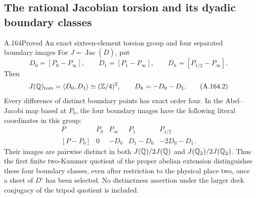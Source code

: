 \subsection{The rational Jacobian torsion and its dyadic boundary classes}

\begin{statement}{A.164}{Proved}
{An exact sixteen-element torsion group and four separated boundary images}
For \(J=\operatorname{Jac}(\overline D)\), put
\[
 D_0=[P_0-P_\infty],\qquad D_1=[P_1-P_\infty],\qquad
 D_h=[P_{1/2}-P_\infty].
\tag{A.164.1}
\]
Then
\[
                 J(\mathbb Q)_{\rm tors}=\langle D_0,D_1\rangle
                          \simeq(\mathbb Z/4)^2,
                \qquad D_h=-D_0-D_1.
\tag{A.164.2}
\]
Every difference of distinct boundary points has exact
order four.  In the Abel--Jacobi map based at \(P_0\),
the four boundary images have the following literal
coordinates in this group:
\[
 \begin{array}{c|cccc}
 P&P_0&P_\infty&P_1&P_{1/2}\\ \hline
 [P-P_0]&0&-D_0&D_1-D_0&-2D_0-D_1.
 \end{array}
\tag{A.164.3}
\]
Their images are pairwise distinct in both
\(J(\mathbb Q)/2J(\mathbb Q)\) and \(J(\mathbb Q_2)/2J(\mathbb Q_2)\).
Thus the first finite two-Kummer quotient of the
proper abelian extension distinguishes these four
boundary classes, even after restriction to the
physical place two, once a sheet of \(D^\circ\)
has been selected.  No distinctness assertion under
the larger deck conjugacy of the tripod quotient
is included.
\end{statement}

